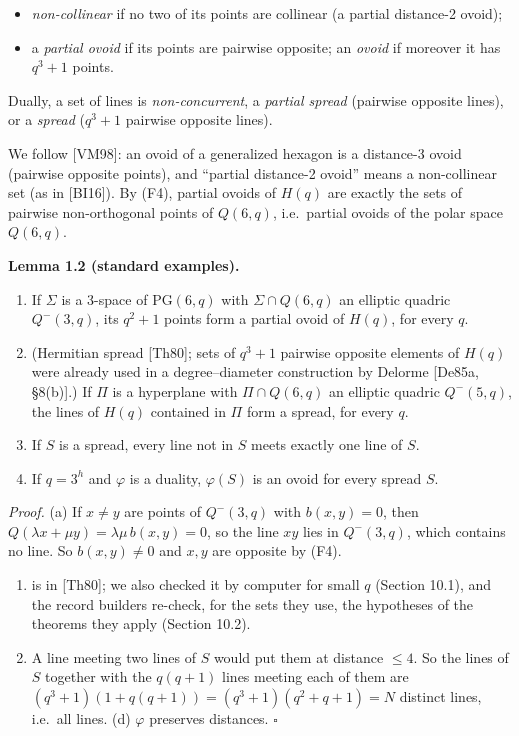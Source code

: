 \documentclass[
  11pt,
]{article}
\providecommand{\tightlist}{%
  \setlength{\itemsep}{0pt}\setlength{\parskip}{0pt}}
\begin{document}
\begin{itemize}
\tightlist
\item
  \emph{non-collinear} if no two of its points are collinear (a partial distance-2 ovoid);
\item
  a \emph{partial ovoid} if its points are pairwise opposite; an \emph{ovoid} if moreover it has \(q^3+1\) points.
\end{itemize}

Dually, a set of lines is \emph{non-concurrent}, a \emph{partial spread} (pairwise opposite lines), or a \emph{spread}
(\(q^3+1\) pairwise opposite lines).

We follow {[}VM98{]}: an ovoid of a generalized hexagon is a distance-3 ovoid (pairwise opposite points), and ``partial
distance-2 ovoid'' means a non-collinear set (as in {[}BI16{]}). By (F4), partial ovoids of \(H(q)\) are exactly the
sets of pairwise non-orthogonal points of \(Q(6,q)\), i.e.~partial ovoids of the polar space \(Q(6,q)\).

\textbf{Lemma 1.2 (standard examples).}

\begin{enumerate}
\def\labelenumi{(\alph{enumi})}
\tightlist
\item
  If \(\Sigma\) is a 3-space of \(\mathrm{PG}(6,q)\) with \(\Sigma\cap Q(6,q)\) an elliptic quadric \(Q^-(3,q)\), its
  \(q^2+1\) points form a partial ovoid of \(H(q)\), for every \(q\).
\item
  (Hermitian spread {[}Th80{]}; sets of \(q^3+1\) pairwise opposite elements of \(H(q)\) were already used in a
  degree--diameter construction by Delorme {[}De85a, §8(b){]}.) If \(\Pi\) is a hyperplane with \(\Pi\cap Q(6,q)\) an
  elliptic quadric \(Q^-(5,q)\), the lines of \(H(q)\) contained in \(\Pi\) form a spread, for every \(q\).
\item
  If \(S\) is a spread, every line not in \(S\) meets exactly one line of \(S\).
\item
  If \(q = 3^h\) and \(\varphi\) is a duality, \(\varphi(S)\) is an ovoid for every spread \(S\).
\end{enumerate}

\emph{Proof.} (a) If \(x\ne y\) are points of \(Q^-(3,q)\) with \(b(x,y) = 0\), then
\(Q(\lambda x+\mu y) = \lambda\mu\, b(x,y) = 0\), so the line \(xy\) lies in \(Q^-(3,q)\), which contains no line. So
\(b(x,y)\ne 0\) and \(x, y\) are opposite by (F4).

\begin{enumerate}
\def\labelenumi{(\alph{enumi})}
\setcounter{enumi}{1}
\tightlist
\item
  is in {[}Th80{]}; we also checked it by computer for small \(q\) (Section 10.1), and the record builders re-check, for
  the sets they use, the hypotheses of the theorems they apply (Section 10.2).
\item
  A line meeting two lines of \(S\) would put them at distance \(\le 4\). So the lines of \(S\) together with the
  \(q(q+1)\) lines meeting each of them are \((q^3+1)(1+q(q+1)) = (q^3+1)(q^2+q+1) = N\) distinct lines, i.e.~all lines.
  (d) \(\varphi\) preserves distances. \(\square\)
\end{enumerate}
\end{document}
